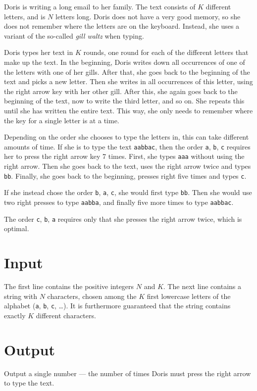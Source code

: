 \def\version{1}
Doris is writing a long email to her family.
The text consists of $K$ different letters, and is $N$ letters long.
Doris does not have a very good memory, so she does not remember where the letters are on the keyboard.
Instead, she uses a variant of the so-called \emph{gill waltz} when typing.

Doris types her text in $K$ rounds, one round for each of the different letters that make up the text.
In the beginning, Doris writes down all occurrences of one of the letters with one of her gills.
After that, she goes back to the beginning of the text and picks a new letter.
Then she writes in all occurrences of this letter, using the right arrow key with her other gill.
After this, she again goes back to the beginning of the text, now to write the third letter, and so on.
She repeats this until she has written the entire text.
This way, she only needs to remember where the key for a single letter is at a time.

Depending on the order she chooses to type the letters in, this can take different amounts of time.
If she is to type the text \texttt{aabbac}, then the order \texttt{a}, \texttt{b}, \texttt{c} requires her to press the right arrow key 7 times.
First, she types \texttt{aaa} without using the right arrow.
Then she goes back to the text, uses the right arrow twice and types \texttt{bb}.
Finally, she goes back to the beginning, presses right five times and types \texttt{c}.

If she instead chose the order \texttt{b}, \texttt{a}, \texttt{c}, she would first type \texttt{bb}.
Then she would use two right presses to type \texttt{aabba}, and finally five more times to type \texttt{aabbac}.

The order \texttt{c}, \texttt{b}, \texttt{a} requires only that she presses the right arrow twice, which is optimal.

\section*{Input}
The first line contains the positive integers $N$ and $K$.
The next line contains a string with $N$ characters, chosen among the $K$ first lowercase letters of the alphabet (\texttt{a}, \texttt{b}, \texttt{c}, \dots).
It is furthermore guaranteed that the string contains exactly $K$ different characters.

\section*{Output}
Output a single number --- the number of times Doris must press the right arrow to type the text.

